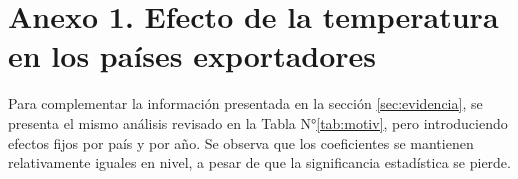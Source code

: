 \chapter{Anexo 1. Efecto de la temperatura en los países exportadores}\label{chap:anexo1}

Para complementar la información presentada en la sección \ref{sec:evidencia}, se presenta el mismo análisis revisado en la Tabla N°\ref{tab:motiv}, pero introduciendo efectos fijos por país y por año. Se observa que los coeficientes se mantienen relativamente iguales en nivel, a pesar de que la significancia estadística se pierde.

